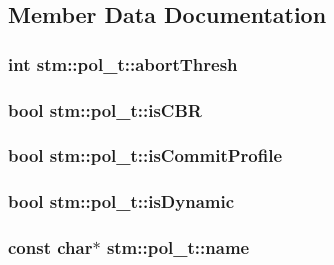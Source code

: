 \subsection{Member Data Documentation}
\hypertarget{structstm_1_1pol__t_a4412e28930c7c9b27f79648a4f03f119}{
\subsubsection[{abort\-Thresh}]{\setlength{\rightskip}{0pt plus 5cm}int stm\-::pol\-\_\-t\-::abort\-Thresh}}\label{structstm_1_1pol__t_a4412e28930c7c9b27f79648a4f03f119}
\hypertarget{structstm_1_1pol__t_aed809be4b01040aa094585064893eb86}{
\subsubsection[{is\-C\-B\-R}]{\setlength{\rightskip}{0pt plus 5cm}bool stm\-::pol\-\_\-t\-::is\-C\-B\-R}}\label{structstm_1_1pol__t_aed809be4b01040aa094585064893eb86}
\hypertarget{structstm_1_1pol__t_a93b2720e97db068bdb5bcedb4c24a77c}{
\subsubsection[{is\-Commit\-Profile}]{\setlength{\rightskip}{0pt plus 5cm}bool stm\-::pol\-\_\-t\-::is\-Commit\-Profile}}\label{structstm_1_1pol__t_a93b2720e97db068bdb5bcedb4c24a77c}
\hypertarget{structstm_1_1pol__t_a1e5b3f8a00cfa2b0582659f246807194}{
\subsubsection[{is\-Dynamic}]{\setlength{\rightskip}{0pt plus 5cm}bool stm\-::pol\-\_\-t\-::is\-Dynamic}}\label{structstm_1_1pol__t_a1e5b3f8a00cfa2b0582659f246807194}
\hypertarget{structstm_1_1pol__t_aa1ec02828e13ae421210813a0530c7e2}{
\subsubsection[{name}]{\setlength{\rightskip}{0pt plus 5cm}const char$\ast$ stm\-::pol\-\_\-t\-::name}}\label{structstm_1_1pol__t_aa1ec02828e13ae421210813a0530c7e2}
